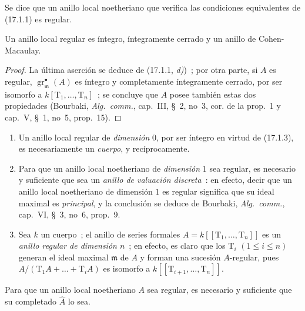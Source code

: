 \begin{definition}[17.1.2]
\label{0.17.1.2-fr}
Se dice que un anillo local noetheriano que verifica las condiciones equivalentes de
\textup{(17.1.1)} es regular.
\end{definition}

\begin{corollary}[17.1.3]
\label{0.17.1.3-fr}
Un anillo local regular es íntegro, íntegramente cerrado y un anillo de
Cohen-Macaulay.
\end{corollary}

\begin{proof}
La última aserción se deduce de (17.1.1, \emph{d)})~; por otra parte, si $A$ es
regular, $\operatorname{gr}^\bullet_{\mathfrak{m}}(A)$ es íntegro y completamente
íntegramente cerrado, por ser isomorfo a $k[\mathrm{T}_1,\ldots,\mathrm{T}_n]$~;
se concluye que $A$ posee también estas dos propiedades (Bourbaki,
\emph{Alg.~comm.}, cap.~III, \S~2, no~3, cor. de la prop.~1 y cap.~V,
\S~1, no~5, prop.~15).
\end{proof}

\begin{examples}[17.1.4]
\label{0.17.1.4-fr}
\begin{enumerate}
  \item[\rm (i)] Un anillo local regular de \emph{dimensión} $0$, por ser
  íntegro en virtud de (17.1.3), es necesariamente un \emph{cuerpo}, y recíprocamente.
  \item[\rm (ii)] Para que un anillo local noetheriano de \emph{dimensión} $1$
  sea regular, es necesario y suficiente que sea un \emph{anillo de valuación
  discreta}~: en efecto, decir que un anillo local noetheriano de dimensión $1$ es
  regular significa que su ideal maximal es \emph{principal}, y la conclusión
  se deduce de Bourbaki, \emph{Alg.~comm.}, cap.~VI, \S~3, no~6, prop.~9.
  \item[\rm (iii)] Sea $k$ un cuerpo~; el anillo de series formales
  $A=k[[\mathrm{T}_1,\ldots,\mathrm{T}_n]]$ es un \emph{anillo regular de
  dimensión $n$}~; en efecto, es claro que los $\mathrm{T}_i$
  $(1\leq i\leq n)$ generan el ideal maximal $\mathfrak{m}$ de $A$ y
  forman una sucesión $A$-regular, pues
  $A/(\mathrm{T}_1A+\ldots+\mathrm{T}_iA)$ es isomorfo a
  $k[[\mathrm{T}_{i+1},\ldots,\mathrm{T}_n]]$.
\end{enumerate}
\end{examples}

\begin{proposition}[17.1.5]
\label{0.17.1.5-fr}
Para que un anillo local noetheriano $A$ sea regular, es necesario y suficiente que
su completado $\widehat{A}$ lo sea.
\end{proposition}

